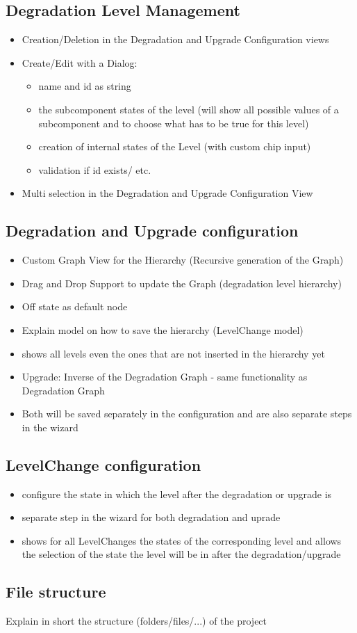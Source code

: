 \subsection{Degradation Level Management}
\begin{itemize}
    \item Creation/Deletion in the Degradation and Upgrade Configuration views
    \item Create/Edit with a Dialog:
    \begin{itemize}
        \item name and id as string
        \item the subcomponent states of the level (will show all possible values of a subcomponent and to choose what has to be true for this level)
        \item creation of internal states of the Level (with custom chip input)
        \item validation if id exists/ etc.
    \end{itemize}
    \item Multi selection in the Degradation and Upgrade Configuration View
\end{itemize}

\subsection{Degradation and Upgrade configuration}
\begin{itemize}
    \item Custom Graph View for the Hierarchy (Recursive generation of the Graph)
    \item Drag and Drop Support to update the Graph (degradation level hierarchy)
    \item Off state as default node
    \item Explain model on how to save the hierarchy (LevelChange model) 
    \item shows all levels even the ones that are not inserted in the hierarchy yet
    \item Upgrade: Inverse of the Degradation Graph - same functionality as Degradation Graph
    \item Both will be saved separately in the configuration and are also separate steps in the wizard
\end{itemize}

\subsection{LevelChange configuration}
\begin{itemize}
    \item configure the state in which the level after the degradation or upgrade is
    \item separate step in the wizard for both degradation and uprade
    \item shows for all LevelChanges the states of the corresponding level and allows the selection of the state the level will be in after the degradation/upgrade 
\end{itemize}

\subsection{File structure}
Explain in short the structure (folders/files/...) of the project

